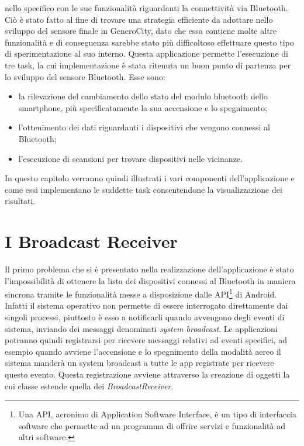  nello specifico con le sue funzionalità riguardanti la connettività via Bluetooth\cite{ref:bluetooth-doc}. Ciò è stato fatto al fine di trovare una strategia efficiente da adottare nello sviluppo del sensore finale in GeneroCity, dato che essa contiene molte altre funzionalità e di conseguenza sarebbe stato più difficoltoso effettuare questo tipo di sperimentazione al suo interno. Questa applicazione permette l'esecuzione di tre task, la cui implementazione è stata ritenuta un buon punto di partenza per lo sviluppo del sensore Bluetooth. Esse sono:
\begin{itemize}
    \item la rilevazione del cambiamento dello stato del modulo bluetooth dello smartphone, più specificatamente la sua accensione e lo spegnimento;
    \item l'ottenimento dei dati riguardanti i dispositivi che vengono connessi al Bluetooth;
    \item l'esecuzione di scansioni per trovare dispositivi nelle vicinanze.
\end{itemize}

In questo capitolo verranno quindi illustrati i vari componenti dell'applicazione e come essi implementano le suddette task consentendone la visualizzazione dei risultati. 

\section{I Broadcast Receiver}
Il primo problema che si è presentato nella realizzazione dell'applicazione è stato l'impossibilità di ottenere la lista dei dispositivi connessi al Bluetooth in maniera sincrona tramite le funzionalità messe a disposizione dalle API\footnote{Una API, acronimo di Application Software Interface, è un tipo di interfaccia software che permette ad un programma di offrire servizi e funzionalità ad altri software.} di Android. Infatti il sistema operativo non permette di essere interrogato direttamente dai singoli processi, piuttosto è esso a notificarli quando avvengono degli eventi di sistema, inviando dei messaggi denominati \textit{system broadcast}. Le applicazioni potranno quindi registrarsi per ricevere messaggi relativi ad eventi specifici, ad esempio quando avviene l'accensione e lo spegnimento della modalità aereo il sistema manderà un system broadcast a tutte le app registrate per ricevere questo evento. Questa registrazione avviene attraverso la creazione di oggetti la cui classe estende quella dei \textit{BroadcastReceiver}.\cite{ref:android-broadcast}

